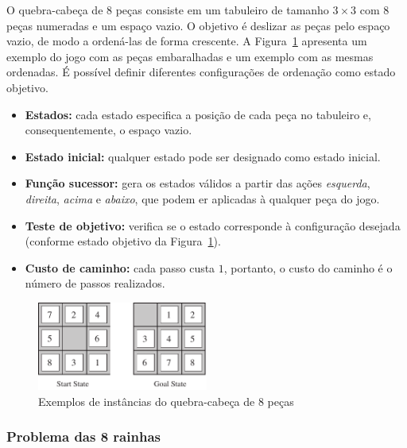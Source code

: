 O quebra-cabeça de 8 peças consiste em um tabuleiro de tamanho $3 \times 3$ com 8 peças numeradas e um espaço vazio. O objetivo é deslizar as peças pelo espaço vazio, de modo a ordená-las de forma crescente. A Figura~\ref{fig:quebra-cabeca-8-pecas} apresenta um exemplo do jogo com as peças embaralhadas e um exemplo com as mesmas ordenadas. É possível definir diferentes configurações de ordenação como estado objetivo.

\begin{itemize}
	\item \textbf{Estados:} cada estado especifica a posição de cada peça no tabuleiro e, consequentemente, o espaço vazio.
	
	\item \textbf{Estado inicial:} qualquer estado pode ser designado como estado inicial.
	
	\item \textbf{Função sucessor:} gera os estados válidos a partir das ações \textit{esquerda}, \textit{direita}, \textit{acima} e \textit{abaixo}, que podem er aplicadas à qualquer peça do jogo.
	
	\item \textbf{Teste de objetivo:} verifica se o estado corresponde à configuração desejada (conforme estado objetivo da Figura~\ref{fig:quebra-cabeca-8-pecas}).
	
	\item \textbf{Custo de caminho:} cada passo custa $1$, portanto, o custo do caminho é o número de passos realizados.
\end{itemize}

\begin{figure}[h]
	\centering
	\includegraphics[width=0.5\textwidth]{img/quebra-cabeca-8-pecas}
	\caption{Exemplos de instâncias do quebra-cabeça de 8 peças}
	\label{fig:quebra-cabeca-8-pecas}
\end{figure}

\subsubsection{Problema das 8 rainhas}

